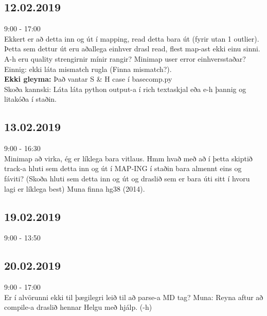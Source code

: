 \documentclass{article}
\begin{document}
\subsection*{12.02.2019}
9:00 - 17:00 \\
Ekkert er að detta inn og út í mapping, read detta bara út (fyrir utan 1 outlier). Þetta sem dettur út eru aðallega einhver drasl read, flest map-ast ekki einu sinni. \\
A-h eru quality strengirnir mínir rangir? Minimap user error einhversstaðar? Einnig: ekki láta mismatch rugla (Finna mismatch?).\\
\textbf{Ekki gleyma: } 
Það vantar S \& H case í basecomp.py \\
Skoða kannski: Láta láta python output-a í rich textaskjal eða e-h þannig og litakóða í staðin.\\

\subsection*{13.02.2019}
9:00 - 16:30\\
Minimap að virka, ég er líklega bara vitlaus. 	
Hmm hvað með að í þetta skiptið track-a hluti sem detta inn og út í MAP-ING í staðin bara almennt eins og fáviti? (Skoða hluti sem detta inn og út og draslið sem er bara úti sitt í hvoru lagi er líklega best)
Muna finna hg38 (2014).


\subsection*{19.02.2019}
9:00 - 13:50 \\

\subsection*{20.02.2019}
9:00 - 17:00\\
Er í alvörunni ekki til þægilegri leið til að parse-a MD tag?
Muna: Reyna aftur að compile-a draslið hennar Helgu með hjálp. (-h)
\end{document}
